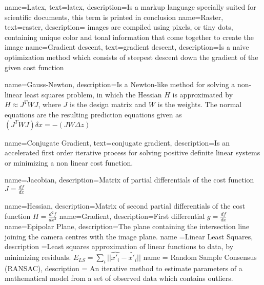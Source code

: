\makeglossaries

{
    name=Latex,
    text=latex,
    description={Is a markup language specially suited 
    for scientific documents, this term is printed in conclusion }
}
{
    name=Raster,
    text=raster,
    description={ images are compiled using pixels, or tiny dots, containing unique color and tonal information that come together to create the image }
}
{
    name=Gradient descent,
    text=gradient descent,
    description={Is a naive optimization method which consists of steepest descent down the gradient of the given cost function}
}

{
    name=Gauss-Newton,
    description={Is a Newton-like method for solving a non-linear least squares problem, in which the Hessian $H$ is approximated by $H \approx J^T WJ$, where $J$ is the design matrix and $W$ is the weights. The normal equations are the resulting prediction equations given as \\ $(J^TWJ) \delta x = -(JW \Delta z)$}
}

{
    name=Conjugate Gradient,
    text=conjugate gradient,
    description={Is an accelerated first order iterative process for solving positive definite linear systems or minimizing a non linear cost function.}
}

{
    name=Jacobian,
    description={Matrix of partial differentials of the cost function $J = \frac{df}{dx}$}
}

{
    name=Hessian,
    description={Matrix of second partial differentials of the cost function $H = \frac{d^2f}{dx^2}$}
}
{
    name=Gradient,
    description={First differential $g = \frac{df}{dx}$}
}
{
    name=Epipolar Plane,
    description={The plane containing the intersection line joining the camera centres with the image plane.}
}
{ 
    name =Linear Least Squares,
    description ={Least squares approximation of linear functions to data, by minimizing residuals.
     $E_{LS} = \sum_i{||\hat{x'_i}- \tilde{x'_i}||}$}
}
{
    name = Random Sample Consensus (RANSAC),
    description = {An iterative method to estimate parameters of a mathematical model from a set of observed data which contains outliers.}
}
